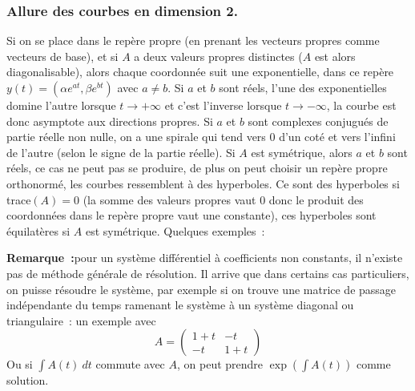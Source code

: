 \documentclass[a4paper,11pt]{article}
\begin{document}
\begin{giacjshere}
\subsubsection{Allure des courbes en dimension 2.}
Si on se place dans le rep\`ere propre (en prenant les vecteurs
propres comme vecteurs de base), et si $A$ a deux valeurs
propres distinctes ($A$ est alors diagonalisable),
alors chaque coordonn\'ee suit une exponentielle, dans ce rep\`ere
$y(t)=(\alpha e^{at}, \beta e^{bt})$ avec $a \neq b$. Si $a$ et $b$
sont r\'eels, l'une des exponentielles domine l'autre lorsque
$t\rightarrow +\infty$ et c'est l'inverse lorsque $t\rightarrow
-\infty$, la courbe est donc asymptote aux directions propres.
Si $a$ et $b$ sont complexes conjugu\'es de partie r\'eelle non nulle, 
on a une spirale qui
tend vers 0 d'un cot\'e et vers l'infini de l'autre (selon le signe
de la partie r\'eelle). Si $A$ est
sym\'etrique, alors $a$ et $b$ sont r\'eels, ce cas ne peut
pas se produire, de plus on peut choisir un rep\`ere propre
orthonorm\'e, les courbes ressemblent \`a des hyperboles.
Ce sont des hyperboles si trace$(A)=0$ (la somme des valeurs
propres vaut 0 donc le produit des coordonn\'ees dans
le rep\`ere propre vaut une constante),
ces hyperboles sont \'equilat\`eres si $A$ est sym\'etrique.
Quelques exemples~:

{\bf Remarque~:}pour un syst\`eme diff\'erentiel \`a coefficients
non constants, il n'existe pas de m\'ethode g\'en\'erale de
r\'esolution. Il arrive que dans certains cas particuliers,
on puisse r\'esoudre le syst\`eme, par exemple si on trouve
une matrice de passage ind\'ependante du temps ramenant
le syst\`eme \`a un syst\`eme diagonal ou triangulaire~:
un exemple avec
$$A=\left(\begin{array}{cc} 1+t & -t \\ -t & 1+t\end{array}\right)$$
Ou si $\int A(t) \ dt$ commute avec $A$, on peut prendre 
$\exp(\int A(t))$ comme solution.


\end{giacjshere}
\end{document}
